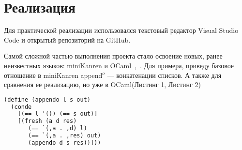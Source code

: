 % 


% 





\section{Реализация}
Для практической реализации использовался текстовый редактор Visual Studio Code и открытый репозиторий на GitHub.

Самой сложной частью выполнения проекта стало освоение новых, ранее неизвестных языков: miniKanren и OCaml~\cite{scheme},~\cite{prog_ocaml}.
Для примера, приведу базовое отношение в miniKanren append$^o$ --- конкатенации списков. А также для сравнения ее реализацию, но уже в OCaml(Листинг 1, Листинг 2)


\begin{lstlisting}[caption=\textbf{Append$^o$ на Scheme (конкатенация двух списков)}, language=lisp, frame=single]
  (define (appendo l s out)
  (conde
    [(== l '()) (== s out)]
    [(fresh (a d res)
       (== `(,a . ,d) l)
       (== `(,a . ,res) out)
       (appendo d s res))])) 
\end{lstlisting}

